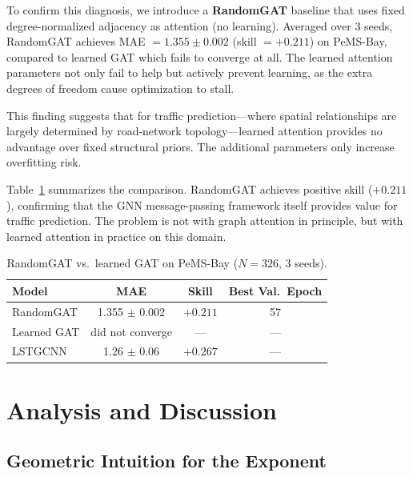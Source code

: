 \documentclass[letterpaper]{article}
\begin{document}
To confirm this diagnosis, we introduce a \textbf{RandomGAT} baseline that uses fixed degree-normalized adjacency as attention (no learning). Averaged over 3 seeds, RandomGAT achieves MAE $= 1.355 \pm 0.002$ (skill $= +0.211$) on PeMS-Bay, compared to learned GAT which fails to converge at all. The learned attention parameters not only fail to help but actively prevent learning, as the extra degrees of freedom cause optimization to stall.

This finding suggests that for traffic prediction---where spatial relationships are largely determined by road-network topology---learned attention provides no advantage over fixed structural priors. The additional parameters only increase overfitting risk.

Table~\ref{tab:randomgat} summarizes the comparison. RandomGAT achieves positive skill ($+0.211$), confirming that the GNN message-passing framework itself provides value for traffic prediction. The problem is not with graph attention in principle, but with learned attention in practice on this domain.

\begin{table}[t]
\small
\centering
\caption{RandomGAT vs.\ learned GAT on PeMS-Bay ($N{=}326$, 3 seeds).}
\label{tab:randomgat}
\begin{tabular}{lccc}
\toprule
Model & MAE & Skill & Best Val.\ Epoch \\
\midrule
RandomGAT    & 1.355 $\pm$ 0.002 & $+0.211$ & 57 \\
Learned GAT  & did not converge   & ---      & --- \\
LSTGCNN      & 1.26  $\pm$ 0.06  & $+0.267$ & --- \\
\bottomrule
\end{tabular}
\end{table}

\section{Analysis and Discussion}

\subsection{Geometric Intuition for the Exponent}
\end{document}
